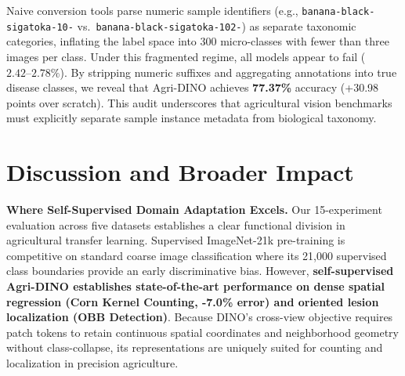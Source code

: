 \documentclass[10pt,twocolumn,letterpaper]{article}
\begin{document}
\begin{table}[t]
\centering
\caption{
  \textbf{PlantSeg benchmark audit: fragmented vs.\ corrected taxonomy.}
  Naive OBB suffix conversion creates 300 sample-specific micro-classes ($\approx 2.6\%$ chance accuracy), whereas our corrected taxonomy aggregates labels into true biological disease classes ($77.37\%$ to $79.37\%$ accuracy).
}
\label{tab:plantseg}
\setlength{\tabcolsep}{4pt}
\small
{}%
\end{table}

Naive conversion tools parse numeric sample identifiers (e.g., \texttt{banana-black-sigatoka-10-} vs.\ \texttt{banana-black-sigatoka-102-}) as separate taxonomic categories, inflating the label space into 300 micro-classes with fewer than three images per class. Under this fragmented regime, all models appear to fail ($2.42\text{--}2.78\%$). By stripping numeric suffixes and aggregating annotations into true disease classes, we reveal that Agri-DINO achieves \textbf{77.37\%} accuracy (+30.98 points over scratch). This audit underscores that agricultural vision benchmarks must explicitly separate sample instance metadata from biological taxonomy.

\section{Discussion and Broader Impact}

\noindent\textbf{Where Self-Supervised Domain Adaptation Excels.}
Our 15-experiment evaluation across five datasets establishes a clear functional division in agricultural transfer learning. Supervised ImageNet-21k pre-training is competitive on standard coarse image classification where its 21,000 supervised class boundaries provide an early discriminative bias. However, \textbf{self-supervised Agri-DINO establishes state-of-the-art performance on dense spatial regression (Corn Kernel Counting, -7.0\% error) and oriented lesion localization (OBB Detection)}. Because DINO's cross-view objective requires patch tokens to retain continuous spatial coordinates and neighborhood geometry without class-collapse, its representations are uniquely suited for counting and localization in precision agriculture.
\end{document}
